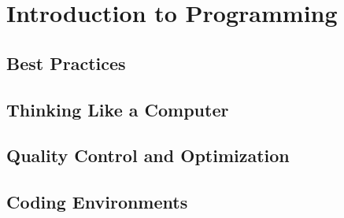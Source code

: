 \part{Introduction to Programming}

\chapter{Best Practices}




\chapter{Thinking Like a Computer}





\chapter{Quality Control and Optimization}



\chapter{Coding Environments}



